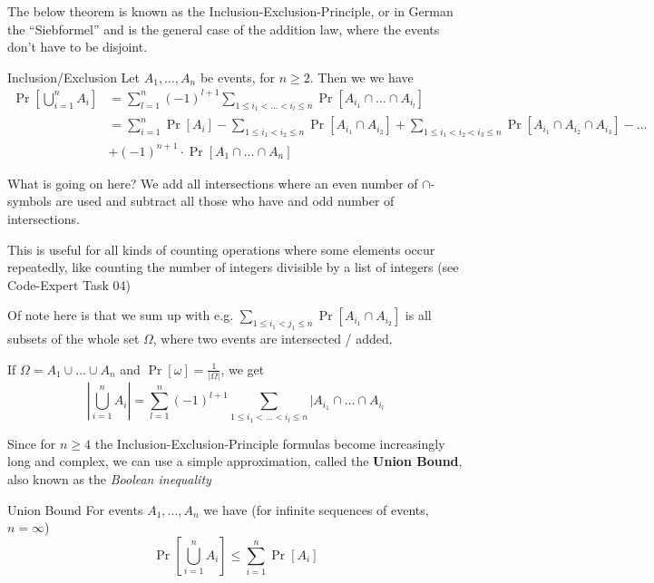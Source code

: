 \newpage
\label{sec:prob-basics}
\setcounter{all}{5}
The below theorem is known as the Inclusion-Exclusion-Principle, or in German the ``Siebformel'' and is the general case of the addition law, where the events don't have to be disjoint.
\begin{theorem}[]{Inclusion/Exclusion}
    Let $A_1, \ldots, A_n$ be events, for $n \geq 2$. Then we we have
    \begin{align*}
        \Pr\left[ \bigcup_{i = 1}^{n} A_i \right] & = \sum_{l = 1}^{n} (-1)^{l + 1} \sum_{1 \leq i_1 < \ldots < i_l \leq n} \Pr[A_{i_1} \cap \ldots \cap A_{i_l}] \\
                                                  & = \sum_{i = 1}^{n} \Pr[A_i] - \sum_{1 \leq i_1 < i_2 \leq n} \Pr[A_{i_1} \cap A_{i_2}]
        + \sum_{1\leq i_1 < i_2 < i_3 \leq n} \Pr[A_{i_1} \cap A_{i_2} \cap A_{i_3}] -\ldots                                                                      \\
                                                  & + (-1)^{n + 1} \cdot \Pr[A_1 \cap \ldots \cap A_n]
    \end{align*}
\end{theorem}

What is going on here? We add all intersections where an even number of $\cap$-symbols are used and subtract all those who have and odd number of intersections.

 This is useful for all kinds of counting operations where some elements occur repeatedly, like counting the number of integers divisible by a list of integers (see Code-Expert Task 04)

Of note here is that we sum up with e.g. $\displaystyle\sum_{1 \leq i_1 < j_1 \leq n} \Pr[A_{i_1} \cap A_{i_2}]$ is all subsets of the whole set $\Omega$, where two events are intersected / added.

If $\Omega = A_1 \cup \ldots \cup A_n$ and $\Pr[\omega] = \frac{1}{|\Omega|}$, we get
\[
    \left|\bigcup_{i = 1}^{n}A_i\right| = \sum_{l = 1}^{n} (-1)^{l + 1} \sum_{1 \leq i_1 < \ldots < i_l \leq n} |A_{i_1} \cap \ldots \cap A_{i_l}
\]

Since for $n \geq 4$ the Inclusion-Exclusion-Principle formulas become increasingly long and complex, we can use a simple approximation, called the \textbf{Union Bound}, also known as the \textit{Boolean inequality}

\begin{corollary}[]{Union Bound}
    For events $A_1, \ldots, A_n$ we have (for infinite sequences of events, $n = \infty$)
    \[
        \Pr\left[ \bigcup_{i = 1}^{n} A_i \right] \leq \sum_{i = 1}^{n} \Pr[A_i]
    \]
\end{corollary}


